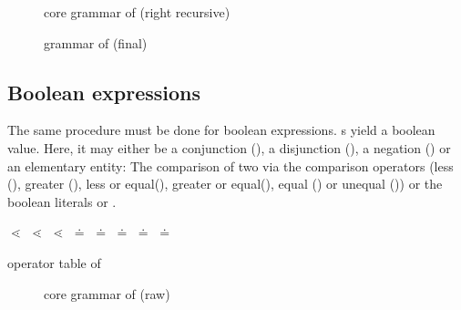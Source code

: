\begin{figure}[H]
	\centering
	
	
	
	\caption{core grammar of  (right recursive)}
	\label{fig:grammar_core_exp_RR}
\end{figure}

\begin{figure}[H]
	\centering
	
	
	
	\caption{grammar of  (final)}
	\label{fig:grammar_core_exp_final}
\end{figure}

\FloatBarrier
\subsection{Boolean expressions}

The same procedure must be done for boolean expressions. s yield a boolean value. Here, it may either be a conjunction (\textterminal{\opand{}}), a disjunction (\textterminal{\opor{}}), a negation (\textterminal{\opneg{}}) or an elementary entity: The comparison of two  via the comparison operators (less (\textterminal{\opless{}}), greater (\textterminal{\opgreater{}}), less or equal(\textterminal{\oplesseq{}}), greater or equal(\textterminal{\opgreatereq{}}), equal (\textterminal{\opeq{}}) or unequal (\textterminal{\opuneq{}})) or the boolean literals  or .

\begin{center}
\textterminal{\opor{}} $\lessdot{}$ \textterminal{\opand{}} $\lessdot{}$ \textterminal{\opneg{}} $\lessdot{}$ \textterminal{\opless{}} $\doteq{}$ \textterminal{\opgreater{}} $\doteq{}$ \textterminal{\oplesseq{}} $\doteq{}$ \textterminal{\opgreatereq{}} $\doteq{}$ \textterminal{\opeq{}} $\doteq{}$ \textterminal{\opuneq{}}
\end{center}

\begin{table}[H]
	\centering
	\caption{operator table of }
	\label{tab:exp_prec}

	
\end{table}

\FloatBarrier

\begin{figure}[H]
	\centering
	
	
	
	\caption{core grammar of  (raw)}
	\label{fig:grammar_core_bool_exp_raw}
\end{figure}

